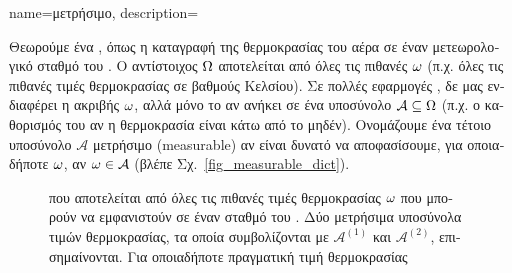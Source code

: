 {name={\foreignlanguage{greek}{μετρήσιμο}}, 
	description={\foreignlanguage{greek}{Θεωρούμε ένα} , 
		\foreignlanguage{greek}{όπως η καταγραφή της θερμοκρασίας του αέρα σε έναν μετεωρολογικό σταθμό του} 
		. \foreignlanguage{greek}{Ο αντίστοιχος}  $\Omega$ 
		\foreignlanguage{greek}{αποτελείται από όλες τις πιθανές}  $\omega$ \foreignlanguage{greek}{(π.χ.
		όλες τις πιθανές τιμές θερμοκρασίας σε βαθμούς Κελσίου). Σε πολλές εφαρμογές} ,
		\foreignlanguage{greek}{δε μας ενδιαφέρει η ακριβής}  $\omega$, \foreignlanguage{greek}{αλλά 
		μόνο το αν ανήκει σε ένα υποσύνολο $\mathcal{A} \subseteq \Omega$ (π.χ. ο καθορισμός του αν η θερμοκρασία 
		είναι κάτω από το μηδέν). Ονομάζουμε ένα τέτοιο υποσύνολο $\mathcal{A}$ μετρήσιμο} (measurable) \foreignlanguage{greek}{αν 
		είναι δυνατό να αποφασίσουμε, για οποιαδήποτε}  $\omega$, \foreignlanguage{greek}{αν 
		$\omega \in \mathcal{A}$ (βλέπε Σχ.}\ \ref{fig_measurable_dict}).
		\begin{figure}[H]
		\begin{center}
			\vspace*{10mm}
			\end{center}
		{
		\caption{ \foreignlanguage{greek}{που αποτελείται από όλες τις 
			πιθανές τιμές θερμοκρασίας $\omega$ που μπορούν να εμφανιστούν σε έναν σταθμό του} . 
			\foreignlanguage{greek}{Δύο μετρήσιμα υποσύνολα τιμών θερμοκρασίας, τα οποία συμβολίζονται με 
			$\mathcal{A}^{(1)}$ και $\mathcal{A}^{(2)}$, επισημαίνονται. Για οποιαδήποτε πραγματική τιμή θερμοκρασίας  
}}}
\end{figure}}}
